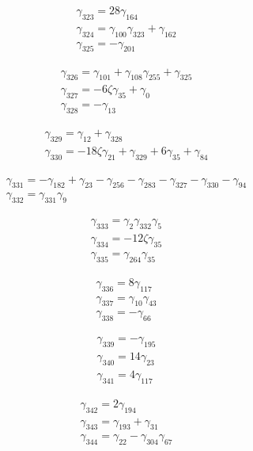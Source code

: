 \[\begin{aligned}\gamma_{323}=28 \gamma_{164}\\ \gamma_{324}=\gamma_{100} \gamma_{323} + \gamma_{162}\\ \gamma_{325}=- \gamma_{201}\end{aligned}\]

\[\begin{aligned}\gamma_{326}=\gamma_{101} + \gamma_{108} \gamma_{255} + \gamma_{325}\\ \gamma_{327}=- 6 \zeta  \gamma_{35} + \gamma_{0}\\ \gamma_{328}=- \gamma_{13}\end{aligned}\]

\[\begin{aligned}\gamma_{329}=\gamma_{12} + \gamma_{328}\\ \gamma_{330}=- 18 \zeta  \gamma_{21} + \gamma_{329} + 6 \gamma_{35} + \gamma_{84}\end{aligned}\]

\[\begin{aligned}\gamma_{331}=- \gamma_{182} + \gamma_{23} - \gamma_{256} - \gamma_{283} - \gamma_{327} - \gamma_{330} - \gamma_{94}\\ \gamma_{332}=\gamma_{331} \gamma_{9}\end{aligned}\]

\[\begin{aligned}\gamma_{333}=\gamma_{2} \gamma_{332} \gamma_{5}\\ \gamma_{334}=- 12 \zeta  \gamma_{35}\\ \gamma_{335}=\gamma_{264} \gamma_{35}\end{aligned}\]

\[\begin{aligned}\gamma_{336}=8 \gamma_{117}\\ \gamma_{337}=\gamma_{10} \gamma_{43}\\ \gamma_{338}=- \gamma_{66}\end{aligned}\]

\[\begin{aligned}\gamma_{339}=- \gamma_{195}\\ \gamma_{340}=14 \gamma_{23}\\ \gamma_{341}=4 \gamma_{117}\end{aligned}\]

\[\begin{aligned}\gamma_{342}=2 \gamma_{194}\\ \gamma_{343}=\gamma_{193} + \gamma_{31}\\ \gamma_{344}=\gamma_{22} - \gamma_{304} \gamma_{67}\end{aligned}\]

